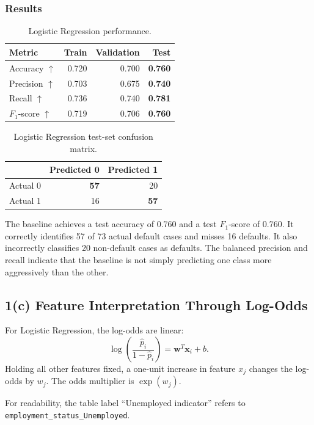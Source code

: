 \documentclass[12pt]{article}
\newcommand{\best}[1]{\textbf{#1}}
\begin{document}
\subsubsection{Results}

\begin{table}[htbp]
\centering
\caption{Logistic Regression performance.}
\begin{tabular}{lrrr}
\toprule
Metric & Train & Validation & Test \\
\midrule
Accuracy $\uparrow$ & 0.720 & 0.700 & \best{0.760} \\
Precision $\uparrow$ & 0.703 & 0.675 & \best{0.740} \\
Recall $\uparrow$ & 0.736 & 0.740 & \best{0.781} \\
$F_1$-score $\uparrow$ & 0.719 & 0.706 & \best{0.760} \\
\bottomrule
\end{tabular}
\end{table}

\begin{table}[htbp]
\centering
\caption{Logistic Regression test-set confusion matrix.}
\begin{tabular}{lrr}
\toprule
 & Predicted 0 & Predicted 1 \\
\midrule
Actual 0 & \best{57} & 20 \\
Actual 1 & 16 & \best{57} \\
\bottomrule
\end{tabular}
\end{table}

The baseline achieves a test accuracy of 0.760 and a test $F_1$-score of 0.760. It correctly identifies 57 of 73 actual default cases and misses 16 defaults. It also incorrectly classifies 20 non-default cases as defaults. The balanced precision and recall indicate that the baseline is not simply predicting one class more aggressively than the other.

\subsection{1(c) Feature Interpretation Through Log-Odds}

For Logistic Regression, the log-odds are linear:
\[
    \log\left(\frac{\hat{p}_i}{1-\hat{p}_i}\right)
    =
    \mathbf{w}^{T}\mathbf{x}_i+b.
\]
Holding all other features fixed, a one-unit increase in feature $x_j$ changes the log-odds by $w_j$. The odds multiplier is $\exp(w_j)$.

For readability, the table label ``Unemployed indicator'' refers to \texttt{employment\_status\_Unemployed}.
\end{document}
